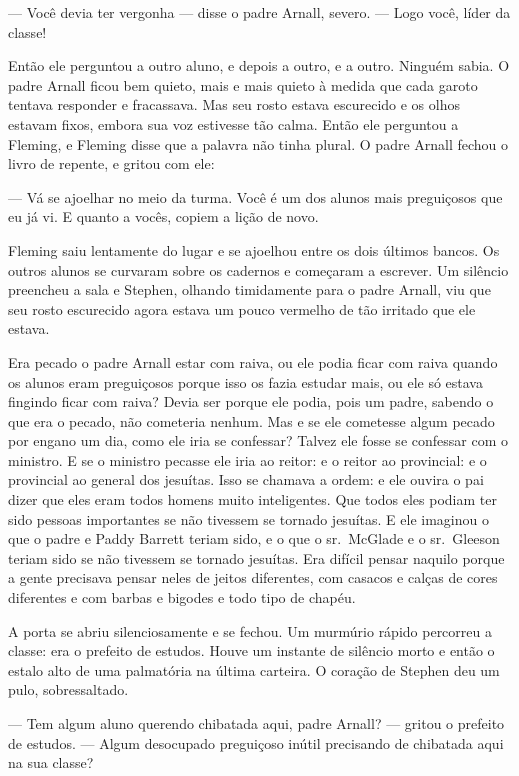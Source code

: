  --- Você devia ter vergonha --- disse o padre Arnall, severo. --- Logo você,
líder da classe!

Então ele perguntou a outro aluno, e depois a outro, e a outro. Ninguém
sabia. O padre Arnall ficou bem quieto, mais e mais quieto à medida que
cada garoto tentava responder e fracassava. Mas seu rosto estava
escurecido e os olhos estavam fixos, embora sua voz estivesse tão
calma. Então ele perguntou a Fleming, e Fleming disse que a palavra não
tinha plural. O padre Arnall fechou o livro de repente, e gritou com
ele:

 --- Vá se ajoelhar no meio da turma. Você é um dos alunos mais preguiçosos
que eu já vi. E quanto a vocês, copiem a lição de novo.

Fleming saiu lentamente do lugar e se ajoelhou entre os dois últimos
bancos. Os outros alunos se curvaram sobre os cadernos e começaram a
escrever. Um silêncio preencheu a sala e Stephen, olhando timidamente
para o padre Arnall, viu que seu rosto escurecido agora estava um pouco
vermelho de tão irritado que ele estava.

Era pecado o padre Arnall estar com raiva, ou ele podia ficar com raiva
quando os alunos eram preguiçosos porque isso os fazia estudar mais, ou
ele só estava fingindo ficar com raiva? Devia ser porque ele podia,
pois um padre, sabendo o que era o pecado, não cometeria nenhum. Mas e
se ele cometesse algum pecado por engano um dia, como ele iria se
confessar? Talvez ele fosse se confessar com o ministro. E se o
ministro pecasse ele iria ao reitor: e o reitor ao provincial: e o
provincial ao general dos jesuítas. Isso se chamava a ordem: e ele
ouvira o pai dizer que eles eram todos homens muito inteligentes. Que
todos eles podiam ter sido pessoas importantes se não tivessem se
tornado jesuítas. E ele imaginou o que o padre e Paddy Barrett teriam
sido, e o que o sr.~McGlade e o sr.~Gleeson teriam sido se não tivessem
se tornado jesuítas. Era difícil pensar naquilo porque a gente
precisava pensar neles de jeitos diferentes, com casacos e calças de
cores diferentes e com barbas e bigodes e todo tipo de chapéu.

A porta se abriu silenciosamente e se fechou. Um murmúrio rápido percorreu a
classe: era o prefeito de estudos. Houve um instante de silêncio morto
e então o estalo alto de uma palmatória na última carteira. O coração
de Stephen deu um pulo, sobressaltado.

 --- Tem algum aluno querendo chibatada aqui, padre Arnall? --- gritou o
prefeito de estudos. --- Algum desocupado preguiçoso inútil precisando de
chibatada aqui na sua classe?

